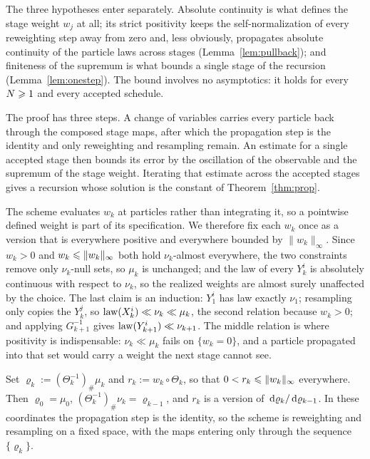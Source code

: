 \documentclass{article}
\begin{document}
\noindent
{\color{red}The three hypotheses enter separately. Absolute continuity is what defines the stage weight $w_j$ at all; its strict positivity keeps the self-normalization of every reweighting step away from zero and, less obviously, propagates absolute continuity of the particle laws across stages (Lemma~\ref{lem:pullback}); and finiteness of the supremum is what bounds a single stage of the recursion (Lemma~\ref{lem:onestep}). The bound involves no asymptotics: it holds for every $N\geqslant1$ and every accepted schedule.}

\medskip\noindent
The proof has three steps. A change of variables carries every particle back through the composed stage maps, after which the propagation step is the identity and only reweighting and resampling remain. An estimate for a single accepted stage then bounds its error by the oscillation of the observable and the supremum of the stage weight. Iterating that estimate across the accepted stages gives a recursion whose solution is the constant of Theorem~\ref{thm:prop}.

\medskip\noindent
The scheme evaluates $w_k$ at particles rather than integrating it, so a pointwise defined weight is part of its specification. We therefore fix each $w_k$ once as a version that is everywhere positive and everywhere bounded by $\lVert w_k\rVert_\infty$. Since $w_k>0$ and $w_k\leqslant\lVert w_k\rVert_\infty$ both hold $\nu_k$-almost everywhere, the two constraints remove only $\nu_k$-null sets, so $\mu_k$ is unchanged; and the law of every $Y_k^i$ is absolutely continuous with respect to $\nu_k$, so the realized weights are almost surely unaffected by the choice. The last claim is an induction: $Y_1^i$ has law exactly $\nu_1$; resampling only copies the $Y_k^j$, so $\operatorname{law}(X_k^i)\ll\nu_k\ll\mu_k$, the second relation because $w_k>0$; and applying $G_{k+1}^{-1}$ gives $\operatorname{law}(Y_{k+1}^i)\ll\nu_{k+1}$. {\color{red}The middle relation is where positivity is indispensable: $\nu_k\ll\mu_k$ fails on $\{w_k=0\}$, and a particle propagated into that set would carry a weight the next stage cannot see.}


\begin{lemma}
\label{lem:pullback}
Set $\varrho_k := (\Theta_k^{-1})_{\#}\mu_k$ and $r_k := w_k\circ\Theta_k$, so that $0 < r_k \leqslant \lVert w_k\rVert_\infty$ everywhere. Then $\varrho_0=\mu_0$, $(\Theta_k^{-1})_{\#}\nu_k = \varrho_{k-1}$, and $r_k$ is a version of $\,\mathrm d\varrho_k/\,\mathrm d\varrho_{k-1}$. In these coordinates the propagation step is the identity, so the scheme is reweighting and resampling on a fixed space, with the maps entering only through the sequence $\{\varrho_k\}$.
\end{lemma}
\end{document}
